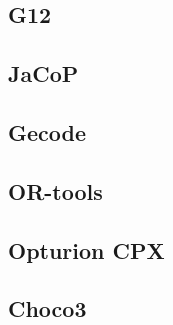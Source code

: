 \subsection{G12}
\subsection{JaCoP}
\subsection{Gecode}
\subsection{OR-tools}
\subsection{Opturion CPX}
\subsection{Choco3}